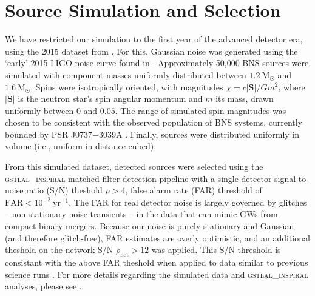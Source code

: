\section{Source Simulation and Selection}

We have restricted our simulation to the first year of the advanced detector era, using the 2015 dataset from \citet{Singer_2014}.  For this, Gaussian noise was generated using the `early' 2015 LIGO noise curve found in \citet{Barsotti:2012}.  Approximately 50,000 BNS sources were simulated with component masses uniformly distributed between $1.2~\mathrm{M}_\odot$ and $1.6~\mathrm{M}_\odot$.  Spins were isotropically oriented, with magnitudes $\chi = c |\mathbf{S}|/G m^2$, where $|\mathbf{S}|$ is the neutron star's spin angular momentum and $m$ its mass, drawn uniformly between $0$ and $0.05$.  The range of simulated spin magnitudes was chosen to be consistent with the observed population of BNS systems, currently bounded by PSR J0737$-$3039A \citep{Burgay_2003,Brown_2012}.  Finally, sources were distributed uniformly in volume (i.e., uniform in distance cubed).

From this simulated dataset, detected sources were selected using the \textsc{gstlal\_inspiral} matched-filter detection pipeline \citep{Cannon_2012} with a single-detector signal-to-noise ratio (S/N) theshold $\rho>4$, false alarm rate (FAR) threshold of $\mathrm{FAR}<10^{-2}~\mathrm{yr}^{-1}$.  The FAR for real detector noise is largely governed by glitches -- non-stationary noise transients -- in the data that can mimic GWs from compact binary mergers.  Because our noise is purely stationary and Gaussian (and therefore glitch-free), FAR estimates are overly optimistic, and an additional theshold on the network S/N $\rho_\mathrm{net} > 12$ was applied.  This S/N threshold is consistant with the above FAR theshold when applied to data similar to previous science runs \cite{2013arXiv1304.0670L}.  For more details regarding the simulated data and \textsc{gstlal\_inspiral} analyses, please see \citet{Singer_2014}.